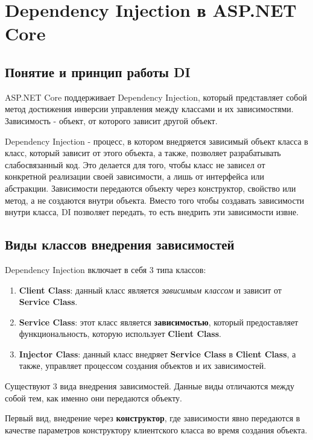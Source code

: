 \documentclass[a4paper,12pt]{report}
\begin{document}
\section{Dependency Injection в ASP.NET Core}

\subsection{Понятие и принцип работы \acs{DI}}

ASP.NET Core поддерживает Dependency Injection, который представляет собой метод достижения инверсии управления 
между классами и их зависимостями. Зависимость - объект, от которого зависит другой объект.

Dependency Injection - процесс, в котором внедряется зависимый объект класса в класс, который зависит от этого объекта, 
а также, позволяет разрабатывать слабосвязанный код. Это делается для того, чтобы класс не зависел от конкретной реализации своей зависимости, 
а лишь от интерфейса или абстракции. Зависимости передаются объекту через конструктор, свойство или метод, а не создаются внутри объекта. 
Вместо того чтобы создавать зависимости внутри класса, \acs{DI} позволяет передать, то есть внедрить эти зависимости извне. 

\subsection{Виды классов внедрения зависимостей}

Dependency Injection включает в себя 3 типа классов:
\begin{enumerate}
    \item
        \textbf{Client Class}: данный класс является \textit{зависимым классом} и зависит от \textbf{Service Class}.
    \item
        \textbf{Service Class}: этот класс является \textbf{зависимостью}, который предоставляет функциональность, которую использует \textbf{Client Class}.
    \item
        \textbf{Injector Class}: данный класс внедряет \textbf{Service Class} в \textbf{Client Class}, а также, управляет процессом создания объектов и их зависимостей.
\end{enumerate}

Существуют 3 вида внедрения зависимостей. Данные виды отличаются между собой тем, как именно они передаются объекту.

Первый вид, внедрение через \textbf{конструктор}, где зависимости явно передаются в качестве параметров конструктору клиентского класса во время создания объекта.
\end{document}
